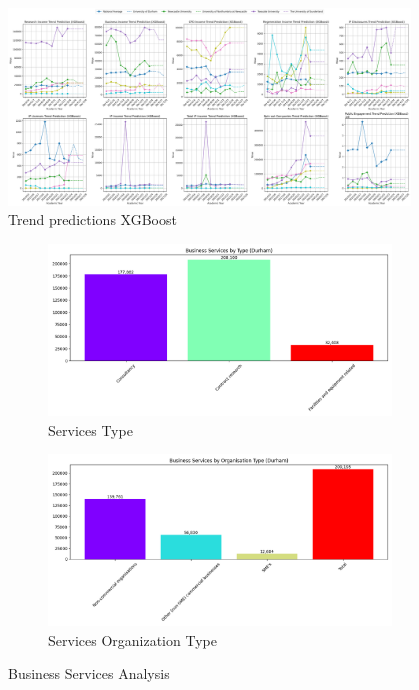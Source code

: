 \documentclass[journal,onecolumn, 10pt,draftclsnofoot]{IEEEtran}
\begin{document}
\begin{figure}[h]
\centering
\includegraphics[width=0.95\textwidth]{Fig/appendix4.trend_predictions_xgboost.png}
\caption{Trend predictions XGBoost}
\label{fig:trend-predictions-xgboost}
\end{figure}

\begin{figure}[h]
    \centering
    \begin{subfigure}[b]{0.48\textwidth}
        \centering
        \includegraphics[width=\linewidth]{Fig/figure7.services_type.png}
        \caption{Services Type}
        \label{fig:services-type}
    \end{subfigure}
    \hfill
    \begin{subfigure}[b]{0.48\textwidth}
        \centering
        \includegraphics[width=\linewidth]{Fig/figure8.services_org_type.png}
        \caption{Services Organization Type}
        \label{fig:services-org-type}
    \end{subfigure}
    \vspace{0.6cm}
    \caption{Business Services Analysis}
    \label{fig:business-services-analysis}
\end{figure}
\end{document}
